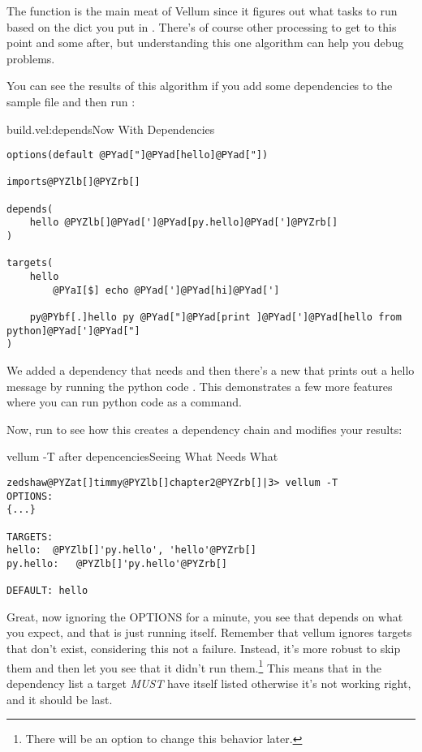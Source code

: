 The  function is the main meat of Vellum since
it figures out what tasks to run based on the dict you put in .
There's of course other processing to get to this point and some after, but
understanding this one algorithm can help you debug problems.

You can see the results of this algorithm if you add some dependencies to the
sample file and then run :

\begin{code}{build.vel:depends}{Now With Dependencies}
\begin{Verbatim}[commandchars=@\[\]]
options(default @PYad["]@PYad[hello]@PYad["])

imports@PYZlb[]@PYZrb[] 

depends(
    hello @PYZlb[]@PYad[']@PYad[py.hello]@PYad[']@PYZrb[]
)

targets(
    hello 
        @PYaI[$] echo @PYad[']@PYad[hi]@PYad[']

    py@PYbf[.]hello py @PYad["]@PYad[print ]@PYad[']@PYad[hello from python]@PYad[']@PYad["]
)
\end{Verbatim}

\end{code}

We added a dependency that  needs  and then
there's a new  that prints out a hello message by running 
the python code .  This demonstrates a few
more features where you can run python code as a command.

Now, run  to see how this creates a dependency chain and
modifies your results:

\begin{code}{vellum -T after depencencies}{Seeing What Needs What}
\begin{Verbatim}[commandchars=@\[\]]
zedshaw@PYZat[]timmy@PYZlb[]chapter2@PYZrb[]|3> vellum -T
OPTIONS:
{...}

TARGETS:
hello:	@PYZlb[]'py.hello', 'hello'@PYZrb[]
py.hello:	@PYZlb[]'py.hello'@PYZrb[]

DEFAULT: hello
\end{Verbatim}

\end{code}

Great, now ignoring the OPTIONS for a minute, you see that  depends
on what you expect, and that  is just running itself.  Remember
that vellum ignores targets that don't exist, considering this not a failure.
Instead, it's more robust to skip them and then let you see that it didn't run
them.\footnote{There will be an option to change this behavior later.}  This
means that in the dependency list a target \emph{MUST} have itself listed
otherwise it's not working right, and it should be last.

